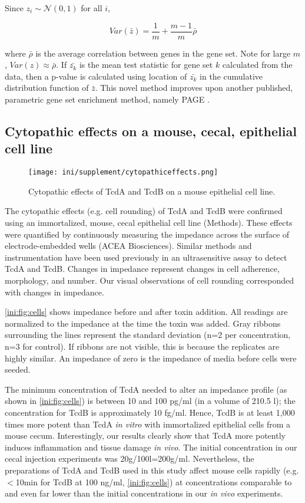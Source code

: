 Since $z_i \sim \mathcal{N}(0,1)$ for all $i$,

\begin{equation}
Var( \bar{z} ) = \frac{1}{m}  + \frac{m-1}{m}\bar{\rho}
\end{equation}

where $\bar{\rho}$ is the average correlation between genes in the gene set. Note for
large $m$, $Var(z) \approx \bar{\rho}$. If $\bar{z_k}$ is the 
mean test statistic for gene set $k$ calculated from the data, then a p-value
is calculated using location of $\bar{z_k}$ in the cumulative distribution 
function of $\bar{z}$. This novel method improves upon another published, parametric gene
set enrichment method, namely PAGE \cite{Kim:2005fw}.


\subsection{Cytopathic effects on a mouse, cecal, epithelial cell line}

\begin{figure}
\centering
\texttt{[image: ini/supplement/cytopathiceffects.png]}
\caption{Cytopathic effects of TcdA and TcdB on a mouse epithelial cell line.}
\label{ini:fig:cells}
\end{figure}

The cytopathic effects (e.g. cell rounding) of TcdA and TcdB were confirmed using an
immortalized, mouse, cecal epithelial cell line (Methods). These effects
were quantified by continuously measuring the impedance across the surface
of electrode-embedded wells (ACEA Biosciences). Similar methods and instrumentation
have been used previously in an ultrasensitive assay to detect TcdA and TcdB. \cite{He:2009hg} 
Changes in impedance represent changes in
cell adherence, morphology, and number. Our visual observations of cell rounding
corresponded with changes in impedance. 

\autoref{ini:fig:cells} shows impedance before and after toxin
addition. All readings are normalized to the impedance
at the time the toxin was added. Gray ribbons surrounding the lines represent
the standard deviation (n=2 per concentration, n=3 for control). If ribbons are not visible, 
this is because the replicates are highly similar. An impedance of zero
is the impedance of media before cells were seeded.

The minimum concentration of 
TcdA needed to alter an impedance profile (as shown in \autoref{ini:fig:cells}) is
between 10 and 100 pg/ml (in a volume of 210.5 \textmugreek{}l); the concentration for TcdB is 
approximately 10 fg/ml. 
Hence, TcdB is at least 1,000 times more potent than TcdA
\emph{in vitro} with immortalized epithelial cells from a mouse cecum. Interestingly, our results
clearly show that TcdA more potently induces inflammation and
tissue damage \emph{in vivo}. 
The initial concentration in our cecal injection experiments was 
20\textmugreek{}g/100\textmugreek{}l=200\textmugreek{}g/ml. 
Nevertheless, the preparations of TcdA and TcdB used
in this study affect mouse cells rapidly (e.g. $<$10min for TcdB at 100 ng/ml, 
\autoref{ini:fig:cells}) at concentrations comparable to and even far lower than 
the initial concentrations in our \emph{in vivo} experiments.


